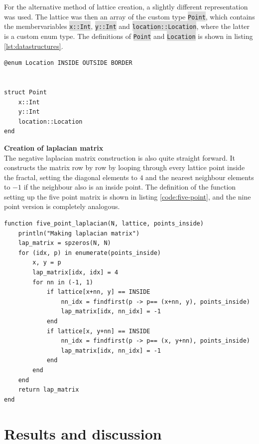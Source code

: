 \documentclass{article}
\begin{document}
For the alternative method of lattice creation, a slightly different representation was used. The lattice was then an array of the custom type \colorbox{gainsboro}{\lstinline{Point}}, which contains the membervariables \colorbox{gainsboro}{\lstinline{x::Int}}, \colorbox{gainsboro}{\lstinline{y::Int}} and \colorbox{gainsboro}{\lstinline{location::Location}}, where the latter is a custom enum type. The definitions of \colorbox{gainsboro}{\lstinline{Point}} and \colorbox{gainsboro}{\lstinline{Location}}
is shown in listing \ref{lst:datastructures}.\\

\begin{lstlisting}[label=lst:datastructures]
@enum Location INSIDE OUTSIDE BORDER


struct Point
    x::Int
    y::Int
    location::Location
end
\end{lstlisting}


\noindent
\textbf{Creation of laplacian matrix}\\
The negative laplacian matrix construction is also quite straight forward. It constructs the matrix row by row by looping through every lattice point inside the fractal, setting the diagonal elements to $4$ and the nearest neighbour elements to $-1$ if the neighbour also is an inside point. The definition of the function setting up the five point matrix is shown in listing \ref{code:five-point}, and the nine point version is completely analogous.\\

\begin{lstlisting}[label=code:five-point]
function five_point_laplacian(N, lattice, points_inside)
    println("Making laplacian matrix")
    lap_matrix = spzeros(N, N)
    for (idx, p) in enumerate(points_inside)
        x, y = p 
        lap_matrix[idx, idx] = 4 
        for nn in (-1, 1)
            if lattice[x+nn, y] == INSIDE
                nn_idx = findfirst(p -> p== (x+nn, y), points_inside)
                lap_matrix[idx, nn_idx] = -1
            end
            if lattice[x, y+nn] == INSIDE
                nn_idx = findfirst(p -> p== (x, y+nn), points_inside)
                lap_matrix[idx, nn_idx] = -1
            end
        end
    end 
    return lap_matrix
end
\end{lstlisting}

\section{Results and discussion}
\end{document}
